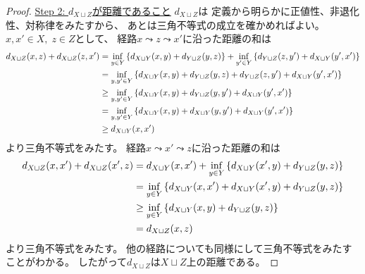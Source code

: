 \documentclass[report, notitlepage]{jlreq}
\begin{document}
\begin{proof}
    \uline{Step 2: $d_{X \sqcup Z}$が距離であること} \quad
    $d_{X \sqcup Z}$は
    定義から明らかに正値性、非退化性、対称律をみたすから、
    あとは三角不等式の成立を確かめればよい。
    $x, x' \in X, \; z \in Z$として、
    経路$x \leadsto z \leadsto x'$に沿った距離の和は
    \begin{alignat}{1}
        d_{X \sqcup Z}(x, z)
            + d_{X \sqcup Z}(z, x')
            &=
                \inf_{y \in Y} \left\{{
                    d_{X \sqcup Y}(x, y) + d_{Y \sqcup Z}(y, z)
                }\right\}
                +
                \inf_{y' \in Y} \left\{{
                    d_{Y \sqcup Z}(z, y') + d_{X \sqcup Y}(y', x')
                }\right\}
                \\
            &=
                \inf_{y, y' \in Y} \left\{{
                    d_{X \sqcup Y}(x, y) + d_{Y \sqcup Z}(y, z)
                    +
                    d_{Y \sqcup Z}(z, y') + d_{X \sqcup Y}(y', x')
                }\right\}
                \\
            &\ge
                \inf_{y, y' \in Y} \left\{{
                    d_{X \sqcup Y}(x, y)
                    + d_{Y \sqcup Z}(y, y')
                    + d_{X \sqcup Y}(y', x')
                }\right\}
                \\
            &=
                \inf_{y, y' \in Y} \left\{{
                    d_{X \sqcup Y}(x, y)
                    + d_{X \sqcup Y}(y, y')
                    + d_{X \sqcup Y}(y', x')
                }\right\}
                \\
            &\ge
                d_{X \sqcup Y}(x, x')
    \end{alignat}
    より三角不等式をみたす。
    経路$x \leadsto x' \leadsto z$に沿った距離の和は
    \begin{alignat}{1}
        d_{X \sqcup Z}(x, x')
            + d_{X \sqcup Z}(x', z)
            &=
                d_{X \sqcup Y}(x, x')
                +
                \inf_{y \in Y} \left\{{
                    d_{X \sqcup Y}(x', y) + d_{Y \sqcup Z}(y, z)
                }\right\}
                \\
            &=
                \inf_{y \in Y} \left\{{
                    d_{X \sqcup Y}(x, x')
                    + d_{X \sqcup Y}(x', y)
                    + d_{Y \sqcup Z}(y, z)
                }\right\}
                \\
            &\ge
                \inf_{y \in Y} \left\{{
                    d_{X \sqcup Y}(x, y)
                    + d_{Y \sqcup Z}(y, z)
                }\right\}
                \\
            &=
                d_{X \sqcup Z}(x, z)
    \end{alignat}
    より三角不等式をみたす。
    他の経路についても同様にして三角不等式をみたすことがわかる。
    したがって$d_{X \sqcup Z}$は$X \sqcup Z$上の距離である。


\end{proof}
\end{document}
